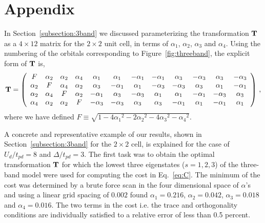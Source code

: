 \section*{Appendix}
In Section~\ref{subsection:3band} we discussed parameterizing the transformation ${\bf T}$ 
as a $4\times12$ matrix for the $2 \times 2$ unit cell, in terms of $\alpha_1$, $\alpha_2$, $\alpha_3$ 
and $\alpha_4$. Using the numbering of the orbitals corresponding to Figure~\ref{fig:threeband}, 
the explicit form of ${\bf T}$ is,
\begin{eqnarray}
{\bf T} = 
\left(
\begin{array}{cccccccccccc}
F        & \alpha_2 &        \alpha_2 &  \alpha_4 & \alpha_1 & \alpha_1 & -\alpha_1 & -\alpha_1 & \alpha_3 & -\alpha_3 & \alpha_3 & -\alpha_3 \\
\alpha_2 &  F       &        \alpha_4 &  \alpha_2 & \alpha_3 & -\alpha_1 & \alpha_1 & -\alpha_3 & -\alpha_3 & \alpha_3 & \alpha_1 & -\alpha_1 \\
\alpha_2 & \alpha_4 & F               &  \alpha_2 & -\alpha_1 & \alpha_3 & -\alpha_3 & \alpha_1 & \alpha_1 & -\alpha_1 & -\alpha_3 & \alpha_3 \\
\alpha_4 & \alpha_2 & \alpha_2        &   F       & -\alpha_3 & -\alpha_3 & \alpha_3 & \alpha_3 & -\alpha_1 & \alpha_1 & -\alpha_1 & \alpha_1 \\
\end{array}
\right)\,,
\end{eqnarray}
where we have defined $F \equiv \sqrt{1-4{\alpha_1}^2 - 2{\alpha_2}^2 - 4 {\alpha_3}^2 -{\alpha_4}^2}$.

A concrete and representative example of our results, shown in Section~\ref{subsection:3band} 
for the $2\times2$ cell, is explained for the case of $U_d/t_{pd}=8$ and $\Delta/t_{pd}=3$. 
The first task was to obtain the optimal transformation ${\bf T}$ 
for which the lowest three eigenstates ($s=1,2,3$) of the three-band model were used for 
computing the cost in Eq.~\eqref{eq:C}. The minimum of the cost was 
determined by a brute force scan in the four dimensional space of $\alpha$'s and 
using a linear grid spacing of $0.002$ found $\alpha_1=0.216$, $\alpha_2=0.042$, $\alpha_3=0.018$ and $\alpha_4=0.016$. 
The two terms in the cost i.e. the trace and orthogonality conditions are individually satisfied to a relative error of 
less than 0.5 percent. 

